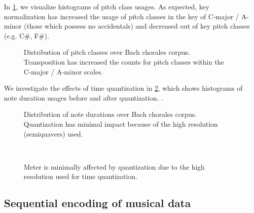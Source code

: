 In \cref{fig:pc-key-standardization}, we visualize histograms of pitch class usages.
As expected, key normalization has increased the usage of pitch classes in the key of
C-major / A-minor (\ie those which possess no accidentals) and decreased out of key
pitch classes (e.g. C\#, F\#).

\begin{figure}
    \centering
    \caption{Distribution of pitch classes over Bach chorales corpus. Transposition has increased the counts
    for pitch classes within the C-major / A-minor scales.}
    \label{fig:pc-key-standardization}
\end{figure}

We investigate the effects of time quantization in
\cref{fig:note-lengths-time-quantization}, which shows histograms of note
duration usages before and after quantization. .

\begin{figure}[tb]
    \centering
    \begin{subfigure}[t]{0.48\textwidth}
        \centering
        
    \end{subfigure}
    \begin{subfigure}[t]{0.48\textwidth}
        \centering
        
    \end{subfigure}
    \caption{Distribution of note durations over Bach chorales corpus. Quantization has minimal impact
    because of the high resolution (semiquavers) used.}
    \label{fig:note-lengths-time-quantization}
\end{figure}

\begin{figure}[tb]
    \centering
    \begin{subfigure}[t]{0.48\textwidth}
        \centering
        
    \end{subfigure}
    ~
    \begin{subfigure}[t]{0.48\textwidth}
        \centering
        
    \end{subfigure}
    \caption{Meter is minimally affected by quantization due to the high resolution used for
    time quantization.}
    \label{fig:meter-time-quantization}
\end{figure}

\subsection{Sequential encoding of musical data}
\label{sec:sequential-encoding}


